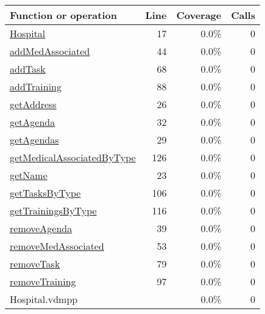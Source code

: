 \bigskip
\begin{longtable}{|l|r|r|r|}
\hline
Function or operation & Line & Coverage & Calls \\
\hline
\hline
\hyperref[Hospital:17]{Hospital} & 17&0.0\% & 0 \\
\hline
\hyperref[addMedAssociated:44]{addMedAssociated} & 44&0.0\% & 0 \\
\hline
\hyperref[addTask:68]{addTask} & 68&0.0\% & 0 \\
\hline
\hyperref[addTraining:88]{addTraining} & 88&0.0\% & 0 \\
\hline
\hyperref[getAddress:26]{getAddress} & 26&0.0\% & 0 \\
\hline
\hyperref[getAgenda:32]{getAgenda} & 32&0.0\% & 0 \\
\hline
\hyperref[getAgendas:29]{getAgendas} & 29&0.0\% & 0 \\
\hline
\hyperref[getMedicalAssociatedByType:126]{getMedicalAssociatedByType} & 126&0.0\% & 0 \\
\hline
\hyperref[getName:23]{getName} & 23&0.0\% & 0 \\
\hline
\hyperref[getTasksByType:106]{getTasksByType} & 106&0.0\% & 0 \\
\hline
\hyperref[getTrainingsByType:116]{getTrainingsByType} & 116&0.0\% & 0 \\
\hline
\hyperref[removeAgenda:39]{removeAgenda} & 39&0.0\% & 0 \\
\hline
\hyperref[removeMedAssociated:53]{removeMedAssociated} & 53&0.0\% & 0 \\
\hline
\hyperref[removeTask:79]{removeTask} & 79&0.0\% & 0 \\
\hline
\hyperref[removeTraining:97]{removeTraining} & 97&0.0\% & 0 \\
\hline
\hline
Hospital.vdmpp & & 0.0\% & 0 \\
\hline
\end{longtable}

